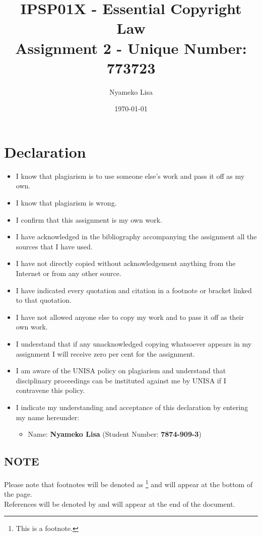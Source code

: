 \documentclass[11pt]{article}
\author{Nyameko Lisa}
\date{\today}
\title{IPSP01X - Essential Copyright Law\\\medskip
\large Assignment 2 - Unique Number: 773723}
\begin{document}
\maketitle
\section*{Declaration}
\label{sec:orga9c989b}
\begin{itemize}
\item I know that plagiarism is to use someone else’s work and pass it off as my own.
\item I know that plagiarism is wrong.
\item I confirm that this assignment is my own work.
\item I have acknowledged in the bibliography accompanying the assignment all the sources that I have used.
\item I have not directly copied without acknowledgement anything from the Internet or from any other source.
\item I have indicated every quotation and citation in a footnote or bracket linked to that quotation.
\item I have not allowed anyone else to copy my work and to pass it off as their own work.
\item I understand that if any unacknowledged copying whatsoever appears in my assignment I will receive zero per cent for the assignment.
\item I am aware of the UNISA policy on plagiarism and understand that disciplinary proceedings can be instituted against me by UNISA if I contravene this policy.
\item I indicate my understanding and acceptance of this declaration by
entering my name hereunder:
\begin{itemize}
\item Name: \textbf{Nyameko Lisa} (Student Number: \textbf{7874-909-3})
\end{itemize}
\end{itemize}

\subsection*{NOTE}
\label{sec:orgac2907a}
Please note that footnotes will be denoted as \footnote{This is a footnote.} and will
appear at the bottom of the page.\\
References will be denoted by \cite{rsa78_copyrightact} and will appear at the end of the document.
\newpage
\end{document}

